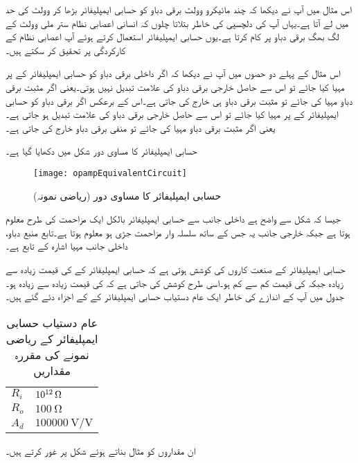 
	اس مثال میں آپ نے دیکھا کہ چند مائیکرو وولٹ برقی دباو کو حسابی ایمپلیفائر بڑھا کر وولٹ کی حد میں لے آتا ہے۔یہاں آپ کی دلچسپی کی خاطر بتلاتا چلوں کہ انسانی اعصابی نظام  ستر ملی وولٹ  کے لگ بھگ برقی دباو پر کام کرتا ہے۔یوں حسابی ایمپلیفائر استعمال کرتے ہوئے  آپ اعصابی نظام کے کارکردگی پر تحقیق کر سکتے ہیں۔ 

	اس مثال کے پہلے دو حصوں میں آپ نے دیکھا کہ اگر داخلی برقی دباو کو حسابی ایمپلیفائر کے   پر مہیا کیا جائے تو اس سے حاصل خارجی برقی دباو کی علامت تبدیل نہیں ہوتی۔یعنی اگر مثبت برقی دباو مہیا کی جائے تو مثبت برقی دباو ہی خارج کی جاتی ہے۔اس کے برعکس اگر برقی دباو کو حسابی ایمپلیفائر کے   پر مہیا کیا جائے تو اس سے حاصل خارجی برقی دباو کی علامت تبدیل ہو جاتی ہے۔یعنی اگر مثبت برقی دباو مہیا کی جائے تو منفی برقی دباو خارج کی جاتی ہے۔

حسابی ایمپلیفائر کا مساوی دور شکل  میں دکھایا گیا ہے۔
\begin{figure}
\centering
\texttt{[image: opampEquivalentCircuit]}
\caption{حسابی ایمپلیفائر کا مساوی دور (ریاضی نمونہ)}
\label{شکل_حسابی_ایمپلیفائر_کا_مساوی_دور}
\end{figure}
جیسا کہ شکل سے واضح ہے داخلی جانب سے حسابی ایمپلیفائر بالکل ایک مزاحمت  کی طرح معلوم ہوتا ہے جبکہ خارجی جانب  یہ  جس کے ساتھ سلسلہ وار مزاحمت  جڑی ہو معلوم ہوتا ہے۔تابع منبع دباو،  داخلی جانب مہیا اشارہ  کے تابع ہے۔

	حسابی ایمپلیفائر کے صنعت کاروں کی کوشش ہوتی ہے کہ حسابی ایمپلیفائر کے   کی قیمت زیادہ سے زیادہ جبکہ    کی قیمت کم سے کم ہو۔اسی طرح کوشش کی جاتی ہے کہ    کی قیمت زیادہ سے زیادہ ہو۔جدول  میں آپ کے اندازے کی خاطر ایک عام دستیاب حسابی ایمپلیفائر کے   کے اجزاء دئے گئے ہیں۔
\begin{table}[ht]
\caption{عام دستیاب حسابی ایمپلیفائر کے ریاضی نمونے کی مقررہ مقداریں}
\label{جدول_حسابی_ایمپلیفائر_عمومی_مقداریں}
\centering
\begin{tabular}{l l}
\toprule
$R_i$ &  $\SI{e{12}}{\ohm}$ \\
$R_o$ & $\SI{100}{\ohm}$\\
$A_d$  & $\SI[per=frac,fraction=nice]{100000}{\volt \per \volt}$ \\
\bottomrule
\end{tabular}
\end{table}
ان مقداروں کو مثال بناتے ہوئے شکل  پر غور کرتے ہیں۔

